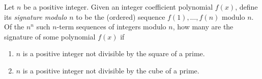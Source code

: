 Let $ n$ be a positive integer. Given an integer coefficient polynomial $ f(x)$, define its \emph{signature modulo $ n$} to be the (ordered) sequence $ f(1), \ldots , f(n)$ modulo $ n$. Of the $ n^n$ such $ n$-term sequences of integers modulo $ n$, how many are the signature of some polynomial $ f(x)$ if
\begin{enumerate}[label=(\alph*)]
	\item $ n$ is a positive integer not divisible by the square of a prime.
	\item $ n$ is a positive integer not divisible by the cube of a prime.
\end{enumerate}
